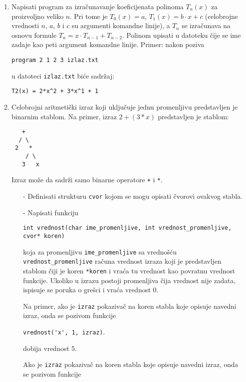 \begin{enumerate}
\item
Napisati program za izra\v cunavanje koeficijenata polinoma $T_{n}(x)$ za
proizvoljno veliko $n$. Pri tome je $T_{0}(x) = a$, $T_{1}(x) = b \cdot x + c$
(celobrojne vrednosti $n$, $a$, $b$ i $c$ su argumenti komandne linije), a
$T_{n}$ se izra\v cunava na osnovu formule $T_{n} = x \cdot T_{n-1} + T_{n-2}$.
Polinom upisati u datoteku \v cije se ime zadaje kao peti argument komandne linije.
Primer: nakon poziva

\verb|program 2 1 2 3 izlaz.txt|

\noindent
u datoteci \verb|izlaz.txt| bi\'ce sadr\v{z}aj:

\verb|T2(x) = 2*x^2 + 3*x^1 + 1|


\item
Celobrojni aritmeti\v cki izraz koji uklju\v{c}uje jednu promenljivu predstavljen
je binarnim stablom. Na primer, izraz $2 + (3 * x)$ predstavljen je stablom:

\begin{verbatim}
   +
  / \
 2   *
    / \
   3   x
\end{verbatim}

Izraz mo\v{z}e da sadr\v{z}i samo binarne operatore \verb|+| i \verb|*|.

\begin{itemize}
\item[-]
Definisati strukturu \verb|cvor| kojom se mogu opisati \v{c}vorovi
ovakvog stabla.

\item[-]
Napisati funkciju

\verb|int vrednost(char ime_promenljive, int vrednost_promenljive, cvor* koren)|

\noindent
koja za promenljivu \verb|ime_promenljive| sa vredno\v s\' cu
\verb|vrednost_promenljive| ra\v cuna vrednost izraza koji je predstavljen
stablom \v{c}iji je koren \verb|*koren| i vra\' ca tu vrednost kao povratnu
vrednost funkcije. Ukoliko u izrazu postoji promenljiva \v{c}ija vrednost
nije zadata, ispisuje se poruka o gre\v{s}ci i vra\'ca vrednost 0.

Na primer, ako je \verb|izraz| pokaziva\v{c} na koren stabla koje opisuje navedni izraz,
onda se pozivom funkcije

\verb|vrednost('x', 1, izraz)|.

\noindent
dobija vrednost 5.

Ako je \verb|izraz| pokaziva\v{c} na koren stabla koje opisuje navedni izraz,
onda se pozivom funkcije


\end{itemize}
\end{enumerate}
